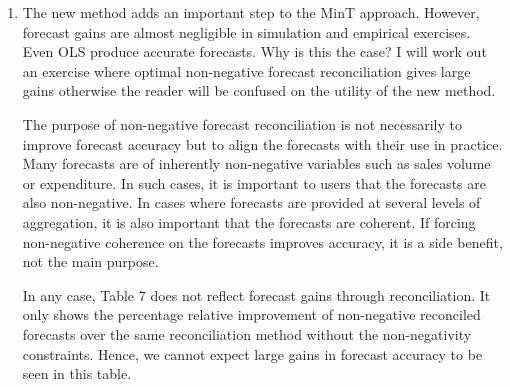 \documentclass[10pt,a4paper]{article}
\begin{document}
\begin{enumerate}
{  %
  }

\item
  The new method adds an important step to the MinT approach. However, forecast gains are almost negligible in simulation and empirical exercises. Even OLS produce accurate forecasts. Why is this the case? I will work out an exercise where optimal non-negative forecast reconciliation gives large gains otherwise the reader will be confused on the utility of the new method.

  {\color{blue} The purpose of non-negative forecast reconciliation is not necessarily to improve forecast accuracy but to align the forecasts with their use in practice. Many forecasts are of inherently non-negative variables such as sales volume or expenditure. In such cases, it is important to users that the forecasts are also non-negative. In cases where forecasts are provided at several levels of aggregation, it is also important that the forecasts are coherent. If forcing non-negative coherence on the forecasts improves accuracy, it is a side benefit, not the main purpose.

  In any case, Table 7 does not reflect forecast gains through reconciliation. It only shows the percentage relative improvement of non-negative reconciled forecasts over the same reconciliation method without the non-negativity constraints. Hence, we cannot expect large gains in forecast accuracy to be seen in this table.

}
\end{enumerate}
\end{document}
